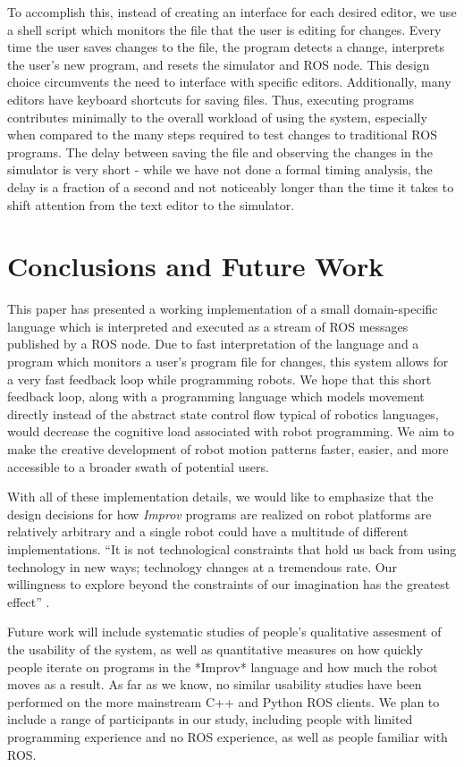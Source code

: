 \documentclass[sigconf]{acmart}
\begin{document}
To accomplish this, instead of creating an interface for each desired
editor, we use a shell script which monitors the file that the user is
editing for changes. Every time the user saves changes to the file, the
program detects a change, interprets the user's new program, and resets
the simulator and ROS node. This design choice circumvents the need to
interface with specific editors. Additionally, many editors have
keyboard shortcuts for saving files. Thus, executing programs
contributes minimally to the overall workload of using the system,
especially when compared to the many steps required to test changes to
traditional ROS programs. The delay between saving the file and observing the
changes in the simulator is very short - while we have not done a formal timing
analysis, the delay is a fraction of a second and not noticeably longer than the
time it takes to shift attention from the text editor to the simulator.

\section{Conclusions and Future
Work}\label{conclusions-and-future-work}

This paper has presented a working implementation of a small domain-specific
language which is interpreted and executed as a stream of ROS messages published
by a ROS node. Due to fast interpretation of the language and a program which
monitors a user's program file for changes, this system allows for a very fast
feedback loop while programming robots. We hope that this short feedback loop,
along with a programming language which models movement directly instead of the
abstract state control flow typical of robotics languages, would decrease the
cognitive load associated with robot programming. We aim to make the creative
development of robot motion patterns faster, easier, and more accessible to a
broader swath of potential users.

With all of these implementation details, we would like to emphasize
that the design decisions for how \emph{Improv} programs are realized on
robot platforms are relatively arbitrary and a single robot could have a
multitude of different implementations. ``It is not technological
constraints that hold us back from using technology in new ways;
technology changes at a tremendous rate. Our willingness to explore
beyond the constraints of our imagination has the greatest effect''
\cite{schiphorst}.

Future work will include systematic studies of people's qualitative assesment of
the usability of the system, as well as quantitative measures on how quickly
people iterate on programs in the *Improv* language and how much the robot moves
as a result. As far as we know, no similar usability studies have been performed
on the more mainstream C++ and Python ROS clients. We plan to include a range of
participants in our study, including people with limited programming experience
and no ROS experience, as well as people familiar with ROS.
\end{document}
